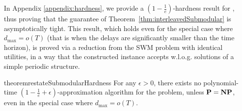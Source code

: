 In Appendix \ref{appendix:hardness}, we provide a $\left(1-\frac{1}{e}\right)$-hardness result for \rsm, thus proving that the guarantee of Theorem~\ref{thm:interleavedSubmodular} is asymptotically tight. This result, which holds even for the special case where $d_{\max} = o(T)$ (that is when the delays are significantly smaller than the time horizon), is proved via a reduction from the SWM problem with identical utilities, in a way that the constructed \rsm instance accepts w.l.o.g. solutions of a simple periodic structure.

\begin{restatable}{theorem}{restateSubmodularHardness}\label{thm:submodular:hardness}
For any $\epsilon>0$, there exists no polynomial-time $\left(1-\frac{1}{e} + \epsilon \right)$-approximation algorithm for the \rsm problem, unless ${\bf P}={\bf NP}$, even in the special case where $d_{\max} = o(T)$.
\end{restatable}